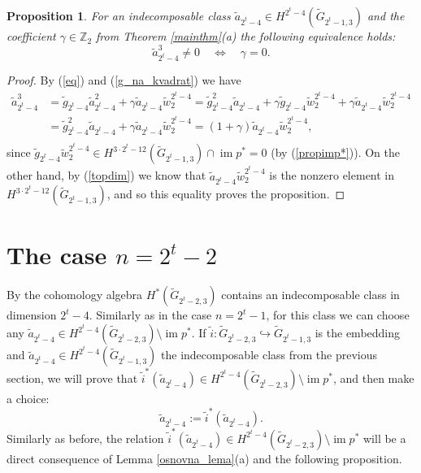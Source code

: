 \documentclass{amsart}
\newcommand{\im}{\operatorname{im}}
\newtheorem{proposition}[theorem]{Proposition}
\theoremstyle{definition}
\theoremstyle{remark}
\numberwithin{equation}{section}
\begin{document}
\begin{proposition}\label{ekv}
For an indecomposable class $\widetilde a_{2^t-4}\in H^{2^t-4}(\widetilde G_{2^t-1,3})$ and the coefficient $\gamma\in\mathbb Z_2$ from Theorem \ref{mainthm}(a) the following equivalence holds:
\[\widetilde a_{2^t-4}^3\neq0 \quad \Longleftrightarrow \quad \gamma=0.\]
\end{proposition}
\begin{proof}
By (\ref{eq}) and (\ref{g_na_kvadrat}) we have
\begin{align*}
\widetilde a_{2^t-4}^3&=\widetilde g_{2^t-4}\widetilde a_{2^t-4}^2+\gamma\widetilde a_{2^t-4}\widetilde w_2^{2^t-4}=\widetilde g_{2^t-4}^2\widetilde a_{2^t-4}+\gamma\widetilde g_{2^t-4}\widetilde w_2^{2^t-4}+\gamma\widetilde a_{2^t-4}\widetilde w_2^{2^t-4}\\
                      &=\widetilde g_{2^t-4}^2\widetilde a_{2^t-4}+\gamma\widetilde a_{2^t-4}\widetilde w_2^{2^t-4}=(1+\gamma)\widetilde a_{2^t-4}\widetilde w_2^{2^t-4},\\
\end{align*}
since $\widetilde g_{2^t-4}\widetilde w_2^{2^t-4}\in H^{3\cdot2^t-12}(\widetilde G_{2^t-1,3})\cap\im p^*=0$ (by (\ref{propimp*})). On the other hand, by (\ref{topdim}) we know that $\widetilde a_{2^t-4}\widetilde w_2^{2^t-4}$ is the nonzero element in $H^{3\cdot2^t-12}(\widetilde G_{2^t-1,3})$, and so this equality proves the proposition.
\end{proof}




\section{The case $n=2^t-2$}
\label{2t-2}

By \cite[Theorem A(b)]{BasuChakraborty} the cohomology algebra $H^*(\widetilde G_{2^t-2,3})$ contains an indecomposable class in dimension $2^t-4$. Similarly as in the case $n=2^t-1$, for this class we can choose any $\widetilde a_{2^t-4}\in H^{2^t-4}(\widetilde G_{2^t-2,3})\setminus\im p^*$. If $\widetilde i:\widetilde G_{2^t-2,3}\hookrightarrow\widetilde G_{2^t-1,3}$ is the embedding and $\widetilde a_{2^t-4}\in H^{2^t-4}(\widetilde G_{2^t-1,3})$ the indecomposable class from the previous section, we will prove that $\widetilde i^*(\widetilde a_{2^t-4})\in H^{2^t-4}(\widetilde G_{2^t-2,3})\setminus\im p^*$, and then make a choice:
\begin{equation}\label{a=i*a}
  \widetilde a_{2^t-4}:=\widetilde i^*(\widetilde a_{2^t-4}). 
\end{equation}
Similarly as before, the relation $\widetilde i^*(\widetilde a_{2^t-4})\in H^{2^t-4}(\widetilde G_{2^t-2,3})\setminus\im p^*$ will be a direct consequence of Lemma \ref{osnovna_lema}(a) and the following proposition.
\end{document}
